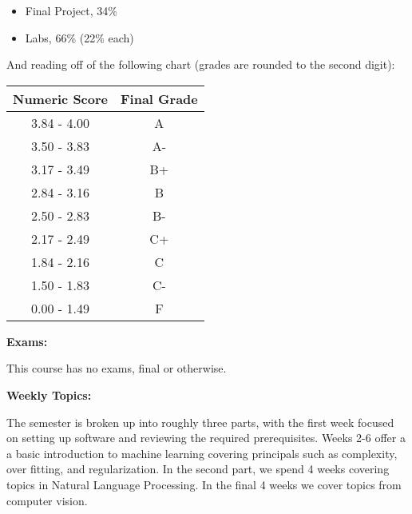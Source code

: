 \documentclass[12pt]{article}
\begin{document}
\begin{itemize}\setlength\itemsep{0em}
\item Final Project, 34\%
\item Labs, 66\% (22\% each)
\end{itemize}

And reading off of the following chart (grades are rounded to the
second digit):

\begin{center}
\begin{tabular}{c || c}
Numeric Score & Final Grade \\
\hline \hline
3.84 - 4.00 & A  \\
3.50 - 3.83 & A- \\
3.17 - 3.49 & B+ \\
2.84 - 3.16 & B  \\
2.50 - 2.83 & B- \\
2.17 - 2.49 & C+ \\
1.84 - 2.16 & C  \\
1.50 - 1.83 & C- \\
0.00 - 1.49 & F
\end{tabular}
\end{center}

\vspace{0.4cm}

\textbf{Exams:} \vspace{6pt}

This course has no exams, final or otherwise.

\newpage

\textbf{Weekly Topics:} \vspace{6pt}

The semester is broken up into roughly three parts, with the
first week focused on setting up software and reviewing the
required prerequisites. Weeks 2-6 offer a a basic introduction
to machine learning covering principals such as complexity,
over fitting, and regularization. In the second part, we spend
4 weeks covering topics in Natural Language Processing. In
the final 4 weeks we cover topics from computer vision.

\vspace{0.5cm}

\def\labelitemi{}
\def\labelitemii{}
\end{document}
